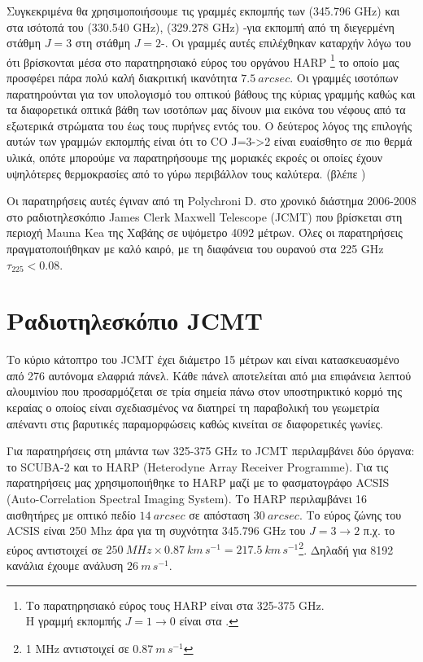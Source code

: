 \documentclass[a4paper,12pt]{memoir}
\begin{document}
Συγκεκριμένα θα χρησιμοποιήσουμε τις γραμμές εκπομπής των  (345.796 GHz) και στα ισότοπά του  (330.540 GHz),  (329.278 GHz) -για εκπομπή από τη διεγερμένη στάθμη $J=3$ στη στάθμη $J=2$-. Οι γραμμές αυτές επιλέχθηκαν καταρχήν λόγω του ότι βρίσκονται μέσα στο παρατηρησιακό εύρος του οργάνου HARP \footnote{Το παρατηρησιακό εύρος τους HARP είναι στα 325-375 GHz. \\ Η γραμμή εκπομπής  $J=1\to 0$ είναι στα .} το οποίο μας προσφέρει πάρα πολύ καλή διακριτική ικανότητα $7.5\ arcsec$. 
 Οι γραμμές ισοτόπων παρατηρούνται για τον υπολογισμό του οπτικού βάθους της κύριας γραμμής καθώς και τα διαφορετικά οπτικά βάθη των ισοτόπων μας δίνουν μια εικόνα του νέφους από τα εξωτερικά στρώματα του έως τους πυρήνες εντός του.
Ο δεύτερος λόγος της επιλογής αυτών των γραμμών εκπομπής είναι ότι το CO J=3->2 είναι ευαίσθητο σε πιο θερμά υλικά, οπότε μπορούμε να παρατηρήσουμε της μοριακές εκροές οι οποίες έχουν υψηλότερες θερμοκρασίες από το γύρω περιβάλλον τους καλύτερα. (βλέπε )

Οι παρατηρήσεις αυτές έγιναν από τη Polychroni D. στο χρονικό διάστημα 2006-2008 στο ραδιοτηλεσκόπιο James Clerk Maxwell Telescope (JCMT) που βρίσκεται στη περιοχή Mauna Kea της Χαβάης σε υψόμετρο 4092 μέτρων. Όλες οι παρατηρήσεις πραγματοποιήθηκαν με καλό καιρό, με τη διαφάνεια του ουρανού στα 225 GHz $\tau _{225} <0.08$.

\bigskip

\section{Ραδιοτηλεσκόπιο JCMT}

Το κύριο κάτοπτρο του JCMT έχει διάμετρο 15 μέτρων και είναι κατασκευασμένο από 276 αυτόνομα ελαφριά πάνελ. Κάθε πάνελ αποτελείται από μια επιφάνεια λεπτού αλουμινίου που προσαρμόζεται σε τρία σημεία πάνω στον υποστηρικτικό κορμό της κεραίας ο οποίος είναι σχεδιασμένος να διατηρεί τη παραβολική του γεωμετρία απέναντι στις βαρυτικές παραμορφώσεις καθώς κινείται σε διαφορετικές γωνίες.

Για παρατηρήσεις στη μπάντα των 325-375 GHz το JCMT περιλαμβάνει δύο όργανα: το SCUBA-2 και το HARP (Heterodyne Array Receiver Programme). Για τις παρατηρήσεις μας χρησιμοποιήθηκε το  HARP μαζί με το φασματογράφο ACSIS (Auto-Correlation Spectral Imaging System). Το HARP περιλαμβάνει 16 αισθητήρες με οπτικό πεδίο $14 \ arcsec$ σε απόσταση $30 \ arcsec$. Το εύρος ζώνης του ACSIS είναι 250 Mhz άρα για τη συχνότητα 345.796 GHz του  $J=3\to 2$ π.χ. το εύρος αντιστοιχεί σε $250\ MHz \times 0.87\ km\,s^{-1} = 217.5\ km\,s^{-1}$\footnote{1 MHz αντιστοιχεί σε $0.87\  m\,s^{-1}$}. Δηλαδή για 8192 κανάλια έχουμε ανάλυση $26\ m\,s^{-1}$. 
\end{document}
